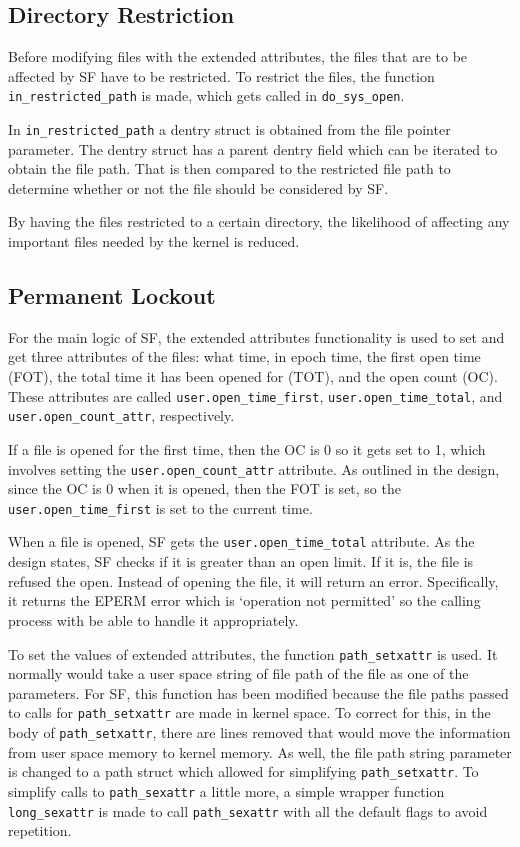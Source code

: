 \subsection{Directory Restriction}

Before modifying files with the extended attributes, the files that are to be affected by SF have to be restricted. To restrict the files, the function \texttt{in\_restricted\_path} is made, which gets called in \texttt{do\_sys\_open}. 

In \texttt{in\_restricted\_path} a dentry struct is obtained from the file pointer parameter. The dentry struct has a parent dentry field which can be iterated to obtain the file path. That is then compared to the restricted file path to determine whether or not the file should be considered by SF.

By having the files restricted to a certain directory, the likelihood of affecting any important files needed by the kernel is reduced. 

\subsection{Permanent Lockout}

For the main logic of SF, the extended attributes functionality is used to set and get three attributes of the files: what time, in epoch time, the first open time (FOT), the total time it has been opened for (TOT), and the open count (OC). These attributes are called \texttt{user.open\_time\_first}, \texttt{user.open\_time\_total}, and \texttt{user.open\_count\_attr}, respectively.

If a file is opened for the first time, then the OC is 0 so it gets set to 1, which involves setting the \texttt{user.open\_count\_attr} attribute. As outlined in the design, since the OC is 0 when it is opened, then the FOT is set, so the \texttt{user.open\_time\_first} is set to the current time.

When a file is opened, SF gets the \texttt{user.open\_time\_total} attribute. As the design states, SF checks if it is greater than an open limit. If it is, the file is refused the open. Instead of opening the file, it will return an error. Specifically, it returns the EPERM error which is `operation not permitted' so the calling process with be able to handle it appropriately. 

To set the values of extended attributes, the function \texttt{path\_setxattr} is used. It normally would take a user space string of file path of the file as one of the parameters. For SF, this function has been modified because the file paths passed to calls for \texttt{path\_setxattr} are made in kernel space. To correct for this, in the body of \texttt{path\_setxattr}, there are lines removed that would move the information from user space memory to kernel memory. As well, the file path string parameter is changed to a path struct which allowed for simplifying \texttt{path\_setxattr}. To simplify calls to \texttt{path\_sexattr} a little more, a simple wrapper function \texttt{long\_sexattr} is made to call \texttt{path\_sexattr} with all the default flags to avoid repetition.

